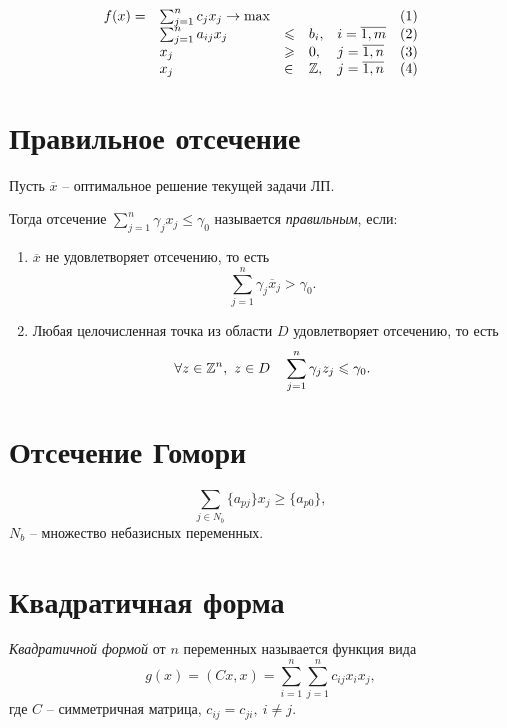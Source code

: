 \[
	\begin{array}{lllllr}
		f(x) = & \sum_{j=1}^{n}c_jx_j \rightarrow \max &           &      &                    & (1) \\
		       & \sum_{j=1}^{n}a_{ij}x_j               & \leqslant & b_i, & i = \overline{1,m} & (2) \\
		       & x_j                                   & \geqslant & 0,   & j = \overline{1,n} & (3) \\
		       & x_j                                   & \in       & \mathbb{Z},  & j = \overline{1,n} & (4)
	\end{array}
\]

\section{Правильное отсечение}

\begin{definition}
	Пусть $\overline{x}$ -- оптимальное решение текущей задачи ЛП.

	Тогда отсечение $\sum_{j=1}^{n} \gamma_j x_j \leqslant \gamma_0$ называется \emph{правильным}, если:
	\begin{enumerate}
		\item $\overline{x}$ не удовлетворяет отсечению, то есть
		      \[
			      \sum_{j=1}^{n} \gamma_j \overline{x}_j > \gamma_0.
		      \]
		\item Любая целочисленная точка из области $D$ удовлетворяет отсечению, то есть
		      \[
			      \forall z \in \mathbb{Z}^n, \ z \in D \quad \sum_{j=1}^{n} \gamma_j z_j \leqslant \gamma_0.
		      \]
	\end{enumerate}
\end{definition}

\section{Отсечение Гомори}

\begin{definition}
	\[
		\sum_{j \in N_b} \{a_{pj}\}x_j \geqslant \{a_{p0}\},
	\]
	$N_b$ -- множество небазисных переменных.
\end{definition}

\section{Квадратичная форма}

\begin{definition}
	\emph{Квадратичной формой} от $n$ переменных называется функция вида
	\[
		g(x) = (Cx,x) = \sum_{i=1}^{n}\sum_{j=1}^{n}c_{ij}x_ix_j,
	\]
	где $C$ -- симметричная матрица, $c_{ij} = c_{ji}, \ i \ne j$.
\end{definition}

